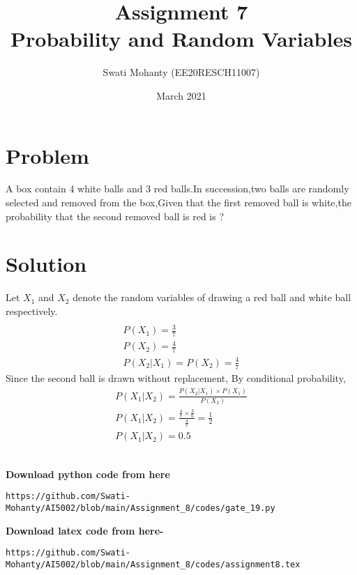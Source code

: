 \documentclass[journal,12pt,twocolumn]{IEEEtran}
\title{Assignment 7
\\Probability and Random Variables }
\author{Swati Mohanty (EE20RESCH11007) }
\date{March 2021}
\begin{document}
\maketitle


\section{Problem}
A box contain 4 white balls and 3 red balls.In succession,two balls are randomly selected and removed from the box,Given that the first removed ball is white,the probability that the second removed ball is red is ?

\section{Solution}
Let $X_1$ and $X_2$ denote the random variables of drawing a red ball and white ball respectively. 
\begin{align}
\\P(X_1) = \frac{3}{7}\\
P(X_2) = \frac{4}{7}
    \\P(X_2|X_1) = P(X_2) = \frac{4}{7}
\end{align}
Since the second ball is drawn without replacement, By conditional probability,
\begin{align}
    P(X_1|X_2) = \frac{P(X_2|X_1)\times P(X_1)}{P(X_2)}
    \\ P(X_1|X_2) = \frac{\frac{4}{7}\times \frac{3}{6} }{\frac{4}{7}} = \frac{1}{2}
    \\ P(X_1|X_2) = 0.5
\end{align}

\\\textbf{Download python code from here}\\
\begin{lstlisting}
https://github.com/Swati-Mohanty/AI5002/blob/main/Assignment_8/codes/gate_19.py
\end{lstlisting}
\textbf{Download latex code from here-}\\
\begin{lstlisting}
https://github.com/Swati-Mohanty/AI5002/blob/main/Assignment_8/codes/assignment8.tex
\end{lstlisting}
\end{document}
